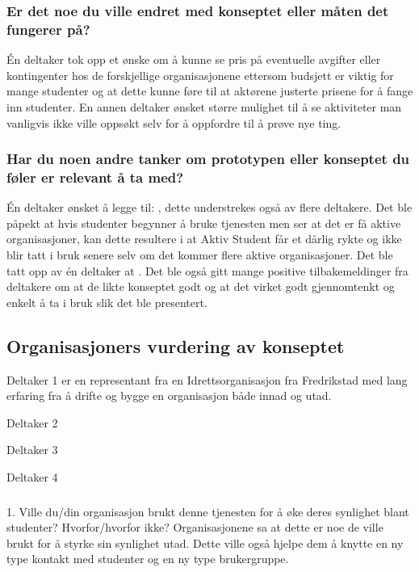 \subsubsection{Er det noe du ville endret med konseptet eller måten det fungerer på?}
Én deltaker tok opp et ønske om å kunne se pris på eventuelle avgifter eller kontingenter hos de forskjellige organisasjonene ettersom budsjett er viktig for mange studenter og at dette kunne føre til at aktørene justerte prisene for å fange inn studenter. En annen deltaker ønsket større mulighet til å se aktiviteter man vanligvis ikke ville oppsøkt selv for å oppfordre til å prøve nye ting.

\subsubsection{Har du noen andre tanker om prototypen eller konseptet du føler er relevant å ta med?}
Én deltaker ønsket å legge til: , dette understrekes også av flere deltakere. Det ble påpekt at hvis studenter begynner å bruke tjenesten men ser at det er få aktive organisasjoner, kan dette resultere i at Aktiv Student får et dårlig rykte og ikke blir tatt i bruk senere selv om det kommer flere aktive organisasjoner. Det ble tatt opp av én deltaker at . Det ble også gitt mange positive tilbakemeldinger fra deltakere om at de likte konseptet godt og at det virket godt gjennomtenkt og enkelt å ta i bruk slik det ble presentert.


\subsection{Organisasjoners vurdering av konseptet}
Deltaker 1 er en representant fra en Idrettsorganisasjon fra Fredrikstad med lang erfaring fra å drifte og bygge en organisasjon både innad og utad.

Deltaker 2

Deltaker 3

Deltaker 4

\subsubsection{}{1. Ville du/din organisasjon brukt denne tjenesten for å øke deres synlighet blant studenter? Hvorfor/hvorfor ikke?}
Organisasjonene sa at dette er noe de ville brukt for å styrke sin synlighet utad. Dette ville også hjelpe dem å knytte en ny type kontakt med studenter og en ny type brukergruppe.

